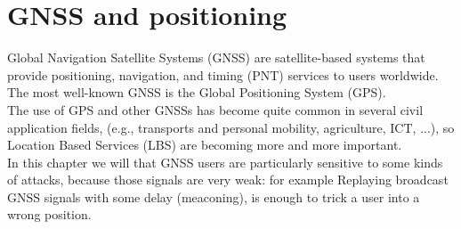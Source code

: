 \chapter{GNSS and positioning}
  Global Navigation Satellite Systems (GNSS) are satellite-based systems that provide positioning, 
  navigation, and timing (PNT) services to users worldwide. The most well-known GNSS is the Global 
  Positioning System (GPS).\\
  The use of GPS and other GNSSs has become quite common in several civil application fields, (e.g.,
  transports and personal mobility, agriculture, ICT, ...), so Location Based Services (LBS) are
  becoming more and more important.\\

  In this chapter we will that GNSS users are particularly sensitive to some kinds of attacks, because
  those signals are very weak: for example Replaying broadcast GNSS signals with some delay 
  (meaconing), is enough to trick a user into a wrong position.\\

